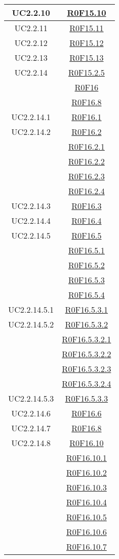 \documentclass[../AnalisiDeiRequisiti.tex]{subfiles}
\begin{document}
\begin{longtable}{|c|c|}
	UC2.2.10 & \hyperlink{R0F15.10}{R0F15.10}\\\hline
	UC2.2.11 & \hyperlink{R0F15.11}{R0F15.11}\\\hline
	UC2.2.12 & \hyperlink{R0F15.12}{R0F15.12}\\\hline
	UC2.2.13 & \hyperlink{R0F15.13}{R0F15.13}\\\hline
	UC2.2.14 & \hyperlink{R0F15.2.5}{R0F15.2.5}\\& \hyperlink{R0F16}{R0F16}\\& \hyperlink{R0F16.8}{R0F16.8}\\\hline
	UC2.2.14.1 & \hyperlink{R0F16.1}{R0F16.1}\\\hline
	UC2.2.14.2 & \hyperlink{R0F16.2}{R0F16.2}\\& \hyperlink{R0F16.2.1}{R0F16.2.1}\\& \hyperlink{R0F16.2.2}{R0F16.2.2}\\& \hyperlink{R0F16.2.3}{R0F16.2.3}\\& \hyperlink{R0F16.2.4}{R0F16.2.4}\\\hline
	UC2.2.14.3 & \hyperlink{R0F16.3}{R0F16.3}\\\hline
	UC2.2.14.4 & \hyperlink{R0F16.4}{R0F16.4}\\\hline
	UC2.2.14.5 & \hyperlink{R0F16.5}{R0F16.5}\\& \hyperlink{R0F16.5.1}{R0F16.5.1}\\& \hyperlink{R0F16.5.2}{R0F16.5.2}\\& \hyperlink{R0F16.5.3}{R0F16.5.3}\\& \hyperlink{R0F16.5.4}{R0F16.5.4}\\\hline
	UC2.2.14.5.1 & \hyperlink{R0F16.5.3.1}{R0F16.5.3.1}\\\hline
	UC2.2.14.5.2 & \hyperlink{R0F16.5.3.2}{R0F16.5.3.2}\\& \hyperlink{R0F16.5.3.2.1}{R0F16.5.3.2.1}\\& \hyperlink{R0F16.5.3.2.2}{R0F16.5.3.2.2}\\& \hyperlink{R0F16.5.3.2.3}{R0F16.5.3.2.3}\\& \hyperlink{R0F16.5.3.2.4}{R0F16.5.3.2.4}\\\hline
	UC2.2.14.5.3 & \hyperlink{R0F16.5.3.3}{R0F16.5.3.3}\\\hline
	UC2.2.14.6 & \hyperlink{R0F16.6}{R0F16.6}\\\hline
	UC2.2.14.7 & \hyperlink{R0F16.8}{R0F16.8}\\\hline
	UC2.2.14.8 & \hyperlink{R0F16.10}{R0F16.10}\\& \hyperlink{R0F16.10.1}{R0F16.10.1}\\& \hyperlink{R0F16.10.2}{R0F16.10.2}\\& \hyperlink{R0F16.10.3}{R0F16.10.3}\\& \hyperlink{R0F16.10.4}{R0F16.10.4}\\& \hyperlink{R0F16.10.5}{R0F16.10.5}\\& \hyperlink{R0F16.10.6}{R0F16.10.6}\\& \hyperlink{R0F16.10.7}{R0F16.10.7}\\\hline

\end{longtable}
\end{document}
